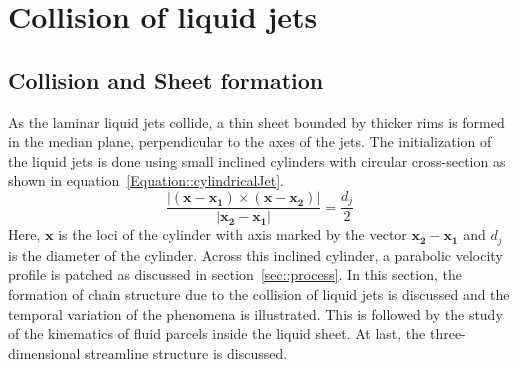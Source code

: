 \chapter{Collision of liquid jets}\label{Chapter::results}
\section{Collision and Sheet formation}
As the laminar liquid jets collide, a thin sheet bounded by thicker rims is formed in the median plane, perpendicular to the axes of the jets. The initialization of the liquid jets is done using small inclined cylinders with circular cross-section as shown in equation~\ref{Equation::cylindricalJet}.
\begin{equation}\label{Equation::cylindricalJet}
\frac{|(\mathbf{x} - \mathbf{x_1})\times(\mathbf{x} - \mathbf{x_2})|}{|\mathbf{x_2} - \mathbf{x_1}|} = \frac{d_j}{2}
\end{equation}
Here, $\mathbf{x}$ is the loci of the cylinder with axis marked by the vector $\mathbf{x_2 - x_1}$ and $d_j$ is the diameter of the cylinder. Across this inclined cylinder, a parabolic velocity profile is patched as discussed in section~\ref{sec::process}. In this section, the formation of chain structure due to the collision of liquid jets is discussed and the temporal variation of the phenomena is illustrated. This is followed by the study of the kinematics of fluid parcels inside the liquid sheet. At last, the three-dimensional streamline structure is discussed.
